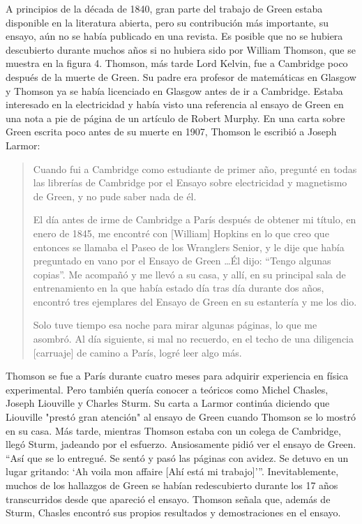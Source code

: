 A principios de la década de 1840, gran parte del trabajo de Green estaba disponible en la literatura abierta, pero su contribución más importante, su ensayo, aún no se había publicado en una revista. Es posible que no se hubiera descubierto durante muchos años si no hubiera sido por William Thomson, que se muestra en la figura 4. Thomson, más tarde Lord Kelvin, fue a Cambridge poco después de la muerte de Green. Su padre era profesor de matemáticas en Glasgow y Thomson ya se había licenciado en Glasgow antes de ir a Cambridge. Estaba interesado en la electricidad y había visto una referencia al ensayo de Green en una nota a pie de página de un artículo de Robert Murphy. En una carta sobre Green escrita poco antes de su muerte en 1907, Thomson le escribió a Joseph Larmor:
\begin{quote}
Cuando fui a Cambridge como estudiante de primer año, pregunté en todas las librerías de Cambridge por el Ensayo sobre electricidad y magnetismo de Green, y no pude saber nada de él.
\par
El día antes de irme de Cambridge a París después de obtener mi título, en enero de 1845, me encontré con [William] Hopkins en lo que creo que entonces se llamaba el Paseo de los Wranglers Senior, y le dije que había preguntado en vano por el Ensayo de Green \ldots Él dijo: \enquote{Tengo algunas copias}. Me acompañó y me llevó a su casa, y allí, en su principal sala de entrenamiento en la que había estado día tras día durante dos años, encontró tres ejemplares del Ensayo de Green en su estantería y me los dio.
\par
Solo tuve tiempo esa noche para mirar algunas páginas, lo que me asombró. Al día siguiente, si mal no recuerdo, en el techo de una diligencia [carruaje] de camino a París, logré leer algo más.
\end{quote}

Thomson se fue a París durante cuatro meses para adquirir experiencia en física experimental. Pero también quería conocer a teóricos como Michel Chasles, Joseph Liouville y Charles Sturm. Su carta a Larmor continúa diciendo que Liouville "prestó gran atención" al ensayo de Green cuando Thomson se lo mostró en su casa. Más tarde, mientras Thomson estaba con un colega de Cambridge, llegó Sturm, jadeando por el esfuerzo. Ansiosamente pidió ver el ensayo de Green. “Así que se lo entregué. Se sentó y pasó las páginas con avidez. Se detuvo en un lugar gritando: ‘Ah voila mon affaire [Ahí está mi trabajo]’”. Inevitablemente, muchos de los hallazgos de Green se habían redescubierto durante los 17 años transcurridos desde que apareció el ensayo. Thomson señala que, además de Sturm, Chasles encontró sus propios resultados y demostraciones en el ensayo.

